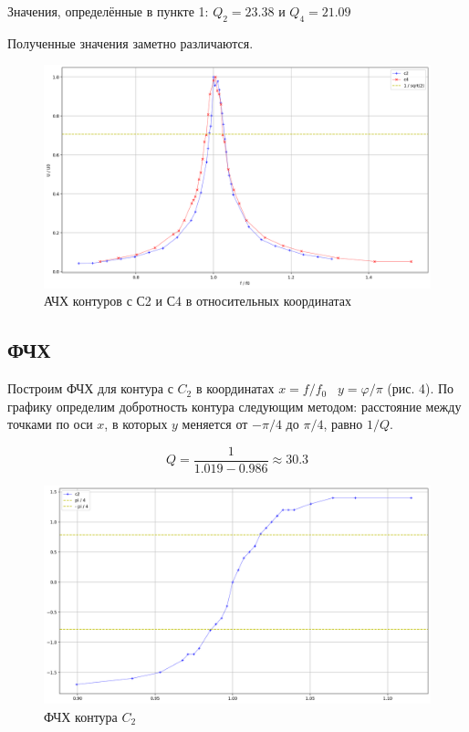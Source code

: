 \documentclass[a4paper]{article}
\begin{document}
Значения, определённые в пункте 1: $Q_2 = 23.38$ и $Q_4 = 21.09$

Полученные значения заметно различаются.

\begin{figure}[H]
    \centering
    \includegraphics[width=\textwidth]{graph2.png}
    \caption{АЧХ контуров с С2 и С4 в относительных координатах}
    \label{fig:vac1}
\end{figure}

\subsection{ФЧХ}

Построим ФЧХ для контура с $C_2$ в координатах $x = f/f_0 \;\;\; y = \varphi/\pi   $ (рис. 4). По графику определим добротность контура следующим методом: расстояние между точками по оси $x$, в которых $y$ меняется от $-\pi/4$ до $\pi/4$, равно $1/Q$.

$$Q = \frac{1}{1.019-0.986} \approx 30.3$$

\begin{figure}[H]
    \centering
    \includegraphics[width=\textwidth]{fchh.png}
    \caption{ФЧХ контура $C_2$}
    \label{fig:vac}
\end{figure}
\end{document}
